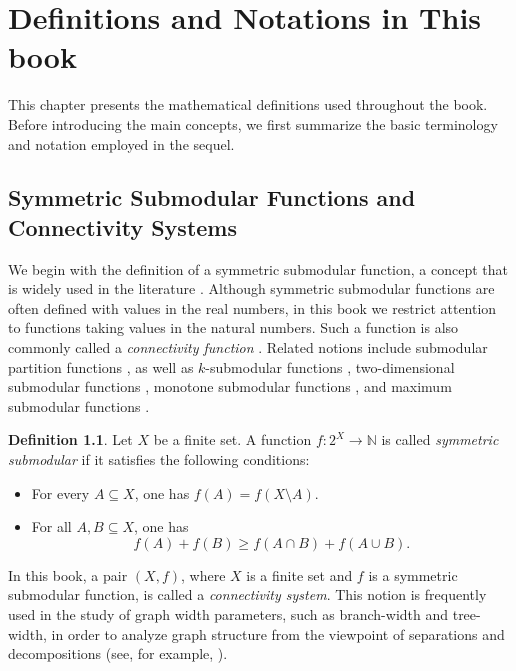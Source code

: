 \documentclass[10pt]{book}
\theoremstyle{definition}
\newtheorem{definition}[theorem]{Definition}
\begin{document}
\newpage

\tableofcontents

\newpage

\chapter{Definitions and Notations in This book}
This chapter presents the mathematical definitions used throughout the book.  
Before introducing the main concepts, we first summarize the basic terminology and notation employed in the sequel.

\section{Symmetric Submodular Functions and Connectivity Systems}

We begin with the definition of a symmetric submodular function, a concept that is widely used in the literature \cite{76,77,78}.  
Although symmetric submodular functions are often defined with values in the real numbers, in this book we restrict attention to functions taking values in the natural numbers.  
Such a function is also commonly called a \emph{connectivity function} \cite{9}.  
Related notions include submodular partition functions \cite{109,110}, as well as \(k\)-submodular functions \cite{284,285,286}, two-dimensional submodular functions \cite{291}, monotone submodular functions \cite{292}, and maximum submodular functions \cite{283}.

\begin{definition}
Let \(X\) be a finite set. A function \(f:2^X\to\mathbb{N}\) is called \emph{symmetric submodular} if it satisfies the following conditions:
\begin{itemize}
    \item For every \(A\subseteq X\), one has \(f(A)=f(X\setminus A)\).
    \item For all \(A,B\subseteq X\), one has
    \[
    f(A)+f(B)\geq f(A\cap B)+f(A\cup B).
    \]
\end{itemize}
\end{definition}

In this book, a pair \((X,f)\), where \(X\) is a finite set and \(f\) is a symmetric submodular function, is called a \emph{connectivity system}.  
This notion is frequently used in the study of graph width parameters, such as branch-width and tree-width, in order to analyze graph structure from the viewpoint of separations and decompositions (see, for example, \cite{2,3,4,9}).
\end{document}
